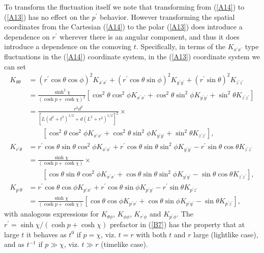 To transform the fluctuation itself we note that transforming from (\ref{A14}) to (\ref{A13}) has no effect on the $p^{\prime}$ behavior. However transforming  the spatial coordinates from the Cartesian (\ref{A14}) to the polar (\ref{A13}) does introduce a dependence on $r^{\prime}$ wherever there is an angular component, and thus it does introduce a dependence on the comoving $t$. Specifically, in terms of the $K_{x^{\prime}x^{\prime}}$ type fluctuations in the (\ref{A14}) coordinate system, in the (\ref{A13}) coordinate system we can set 
%
\begin{align}
K_{\theta\theta}&=(r^{\prime}\cos\theta\cos\phi)^2K_{x^{\prime}x^{\prime}}+(r^{\prime}\cos\theta\sin\phi)^2K_{y^{\prime}y^{\prime}}+(r^{\prime}\sin\theta)^2K_{z^{\prime}z^{\prime}}
\nonumber\\
&=\frac{\sinh^2\chi}{(\cosh p+\cosh \chi)^2}[\cos^2\theta\cos^2\phi K_{x^{\prime}x^{\prime}}+\cos^2\theta\sin^2\phi K_{y^{\prime}y^{\prime}}+\sin^2\theta K_{z^{\prime}z^{\prime}}]
\nonumber\\
&=\frac{r^2d^2}{[L(d^2+t^2)^{1/2}+d(L^2+r^2)^{1/2}]^2}\times
\nonumber\\
&\qquad[\cos^2\theta\cos^2\phi K_{x^{\prime}x^{\prime}}+\cos^2\theta\sin^2\phi K_{y^{\prime}y^{\prime}}+\sin^2\theta K_{z^{\prime}z^{\prime}}],
\nonumber\\
K_{r^{\prime}\theta}&=r^{\prime}\cos\theta\sin\theta\cos^2\phi K_{x^{\prime}x^{\prime}}+r^{\prime}\cos\theta\sin\theta\sin^2\phi K_{y^{\prime}y^{\prime}}-r^{\prime}\sin\theta\cos\theta K_{z^{\prime}z^{\prime}}
\nonumber\\
&=\frac{\sinh\chi}{(\cosh p+\cosh \chi)}\times 
\nonumber\\
&\qquad[\cos\theta\sin\theta\cos^2\phi K_{x^{\prime}x^{\prime}}+\cos\theta\sin\theta\sin^2\phi K_{y^{\prime}y^{\prime}}-\sin\theta\cos\theta K_{z^{\prime}z^{\prime}}],
\nonumber\\
K_{p^{\prime}\theta}&=r^{\prime}\cos\theta\cos\phi K_{p^{\prime}x^{\prime}}+r^{\prime}\cos\theta\sin\phi K_{p^{\prime}y^{\prime}}-r^{\prime}\sin\theta K_{p^{\prime}z^{\prime}}
\nonumber\\
&=\frac{\sinh\chi}{(\cosh p+\cosh \chi)}[\cos\theta\cos\phi K_{p^{\prime}x^{\prime}}+\cos\theta\sin\phi K_{p^{\prime}y^{\prime}}-\sin\theta K_{p^{\prime}z^{\prime}}],
\label{B7}
\end{align}
%
with analogous expressions for $K_{\theta\phi}$, $K_{\phi\phi}$, $K_{r^{\prime}\phi}$ and $K_{p^{\prime}\phi}$. The $r^{\prime}=\sinh \chi/(\cosh p +\cosh \chi)$ prefactor in (\ref{B7}) has the property that at large $t$ it behaves  as $t^0$ if $p=\chi$, viz. $t=r$ with both $t$ and $r$ large (lightlike case), and as $t^{-1}$ if $p\gg \chi$, viz. $t \gg r$ (timelike case).

